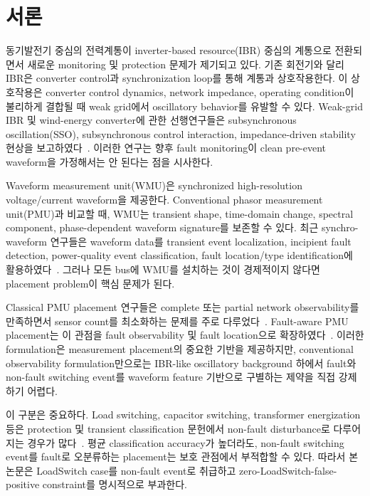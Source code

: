 \documentclass[conference]{IEEEtran}
\begin{document}
\section{서론}

동기발전기 중심의 전력계통이 inverter-based resource(IBR) 중심의 계통으로 전환되면서 새로운 monitoring 및 protection 문제가 제기되고 있다. 기존 회전기와 달리 IBR은 converter control과 synchronization loop를 통해 계통과 상호작용한다. 이 상호작용은 converter control dynamics, network impedance, operating condition이 불리하게 결합될 때 weak grid에서 oscillatory behavior를 유발할 수 있다. Weak-grid IBR 및 wind-energy converter에 관한 선행연구들은 subsynchronous oscillation(SSO), subsynchronous control interaction, impedance-driven stability 현상을 보고하였다~\cite{liu2017subsynchronous,yuan2020investigating,liu2017mechanism,liu2019frequency,sun2011impedance,wen2016impedance,chowdhury2017nonlinear,shair2022adaptive,azimi2022supplementary,yoon2024deep}. 이러한 연구는 향후 fault monitoring이 clean pre-event waveform을 가정해서는 안 된다는 점을 시사한다.

Waveform measurement unit(WMU)은 synchronized high-resolution voltage/current waveform을 제공한다. Conventional phasor measurement unit(PMU)과 비교할 때, WMU는 transient shape, time-domain change, spectral component, phase-dependent waveform signature를 보존할 수 있다. 최근 synchro-waveform 연구들은 waveform data를 transient event localization, incipient fault detection, power-quality event classification, fault location/type identification에 활용하였다~\cite{izadi2021synchronous,izadi2022synchronized,mansourlakouraj2023waveform}. 그러나 모든 bus에 WMU를 설치하는 것이 경제적이지 않다면 placement problem이 핵심 문제가 된다.

Classical PMU placement 연구들은 complete 또는 partial network observability를 만족하면서 sensor count를 최소화하는 문제를 주로 다루었다~\cite{nuqui2005phasor,gou2008generalized,peng2006optimal,rakpenthai2007optimal,carvalho2018observability}. Fault-aware PMU placement는 이 관점을 fault observability 및 fault location으로 확장하였다~\cite{eissa2018hierarchical,pokharel2009optimal}. 이러한 formulation은 measurement placement의 중요한 기반을 제공하지만, conventional observability formulation만으로는 IBR-like oscillatory background 하에서 fault와 non-fault switching event를 waveform feature 기반으로 구별하는 제약을 직접 강제하기 어렵다.

이 구분은 중요하다. Load switching, capacitor switching, transformer energization 등은 protection 및 transient classification 문헌에서 non-fault disturbance로 다루어지는 경우가 많다~\cite{faiz2007adaptive,wang2003classification,shahrtash2006high,perera2008power,costa2010detection,hajibandeh2017classifications,sadeghkhani2016transient,bera2021discrimination,veerasamy2021lstm,zanjani2013high}. 평균 classification accuracy가 높더라도, non-fault switching event를 fault로 오분류하는 placement는 보호 관점에서 부적합할 수 있다. 따라서 본 논문은 LoadSwitch case를 non-fault event로 취급하고 zero-LoadSwitch-false-positive constraint를 명시적으로 부과한다.
\end{document}

